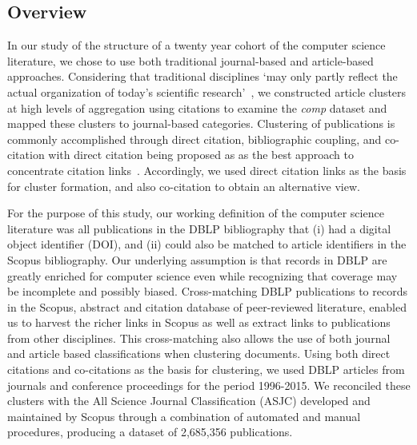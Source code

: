  \subsection{Overview}
 In our study of the structure of a twenty year cohort of the computer science literature, we chose to use both traditional journal-based and article-based approaches. Considering that traditional disciplines `may only partly reflect the actual organization of today's scientific research'~\cite{waltman_new_2012}, we constructed article clusters at high levels of aggregation using citations to examine the \emph{comp} dataset and mapped these clusters to journal-based categories.
 Clustering of publications is commonly accomplished through direct citation, bibliographic coupling, and co-citation with direct citation being proposed as as the best approach to concentrate citation links~\cite{klavans_which_2017}. 
Accordingly, we used direct citation links as the basis for cluster formation, and also co-citation to obtain an alternative view.

For the purpose of this study, our working definition of the computer science literature was all publications in the DBLP bibliography that (i) had a digital object identifier (DOI), and (ii) could also be matched to article identifiers in the Scopus bibliography. 
Our underlying assumption is that records in DBLP are greatly enriched for computer science even while recognizing that coverage may be incomplete and possibly biased. Cross-matching DBLP publications to records in the Scopus, abstract and citation database of peer-reviewed literature, enabled us to harvest the richer links in Scopus as well as extract links to publications from other disciplines. This cross-matching also allows the use of both journal and article based classifications when clustering documents. Using both direct citations and co-citations as the basis for clustering, we used DBLP articles from journals and conference proceedings for the period 1996-2015. We reconciled these clusters with the All Science Journal Classification (ASJC) developed and maintained by Scopus through a combination of automated and manual procedures, producing a dataset of  2,685,356 publications.


